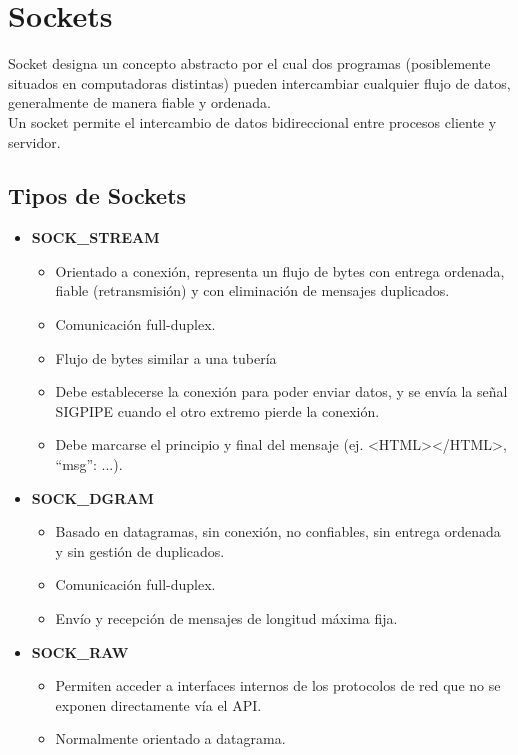 \section{Sockets}
Socket designa un concepto abstracto por el cual dos programas (posiblemente situados en computadoras distintas) pueden intercambiar cualquier flujo de datos, generalmente de manera fiable y ordenada.\\

Un socket permite el intercambio de datos bidireccional entre procesos cliente y servidor.
\subsection{Tipos de Sockets}
\begin{itemize}
    \item \textbf{SOCK\_STREAM}
    \begin{itemize}
        \item Orientado a conexión, representa un flujo de bytes con entrega ordenada, fiable (retransmisión) y con eliminación de mensajes duplicados.
        \item Comunicación full-duplex.
        \item Flujo de bytes similar a una tubería
        \item Debe establecerse la conexión para poder enviar datos, y se envía la señal SIGPIPE cuando el otro extremo pierde la conexión.
        \item Debe marcarse el principio y final del mensaje (ej. <HTML></HTML>, { “msg”: {...}}).
    \end{itemize}
    
    \item \textbf{SOCK\_DGRAM}
    \begin{itemize}
        \item Basado en datagramas, sin conexión, no confiables, sin entrega ordenada y sin gestión de duplicados.
        \item Comunicación full-duplex.
        \item Envío y recepción de mensajes de longitud máxima fija.
    \end{itemize}
    
    \item \textbf{SOCK\_RAW}
    \begin{itemize}
        \item Permiten acceder a interfaces internos de los protocolos de red que no se exponen directamente vía el API.
        \item Normalmente orientado a datagrama.
    \end{itemize}
\end{itemize}